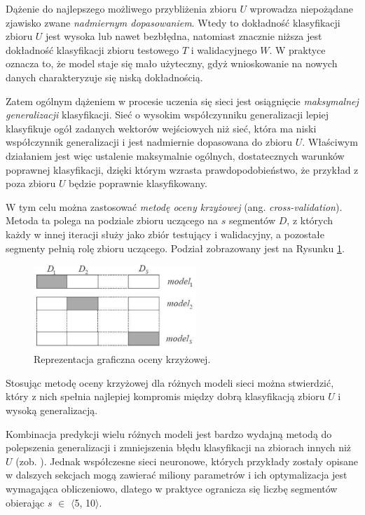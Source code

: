 Dążenie do najlepszego możliwego przybliżenia zbioru $U$ wprowadza niepożądane zjawisko zwane \textit{nadmiernym dopasowaniem}. Wtedy to dokładność klasyfikacji zbioru $U$ jest wysoka lub nawet bezbłędna, natomiast znacznie niższa jest dokładność klasyfikacji zbioru testowego $T$ i walidacyjnego $W$. W praktyce oznacza to, że model staje się mało użyteczny, gdyż wnioskowanie na nowych danych charakteryzuje się niską dokładnością.

Zatem ogólnym dążeniem w procesie uczenia się sieci jest osiągnięcie \textit{maksymalnej generalizacji} klasyfikacji. Sieć o wysokim współczynniku generalizacji lepiej klasyfikuje ogół zadanych wektorów wejściowych niż sieć, która ma niski współczynnik generalizacji i jest nadmiernie dopasowana do zbioru $U$. Właściwym działaniem jest więc ustalenie maksymalnie ogólnych, dostatecznych warunków poprawnej klasyfikacji, dzięki którym wzrasta prawdopodobieństwo, że przykład z poza zbioru $U$ będzie poprawnie klasyfikowany.

W tym celu można zastosować \textit{metodę oceny krzyżowej} (ang. \textit{cross-validation}). Metoda ta polega na podziale zbioru uczącego na $s$ segmentów $D$, z których każdy w innej iteracji służy jako zbiór testujący i walidacyjny, a pozostałe segmenty pełnią rolę zbioru uczącego. Podział zobrazowany jest na Rysunku \ref{cross-validation}.
\begin{figure}[h!]
	\centering
	\includegraphics[width=0.55\textwidth]{figures/cross-validation.png}
	\caption{Reprezentacja graficzna oceny krzyżowej.}
	\label{cross-validation}
\end{figure}
Stosując metodę oceny krzyżowej dla różnych modeli sieci można stwierdzić, który z nich spełnia najlepiej kompromis między dobrą klasyfikacją zbioru $U$ i wysoką generalizacją.

Kombinacja predykcji wielu różnych modeli jest bardzo wydajną metodą do polepszenia generalizacji i zmniejszenia błędu klasyfikacji na zbiorach innych niż $U$ (zob. \cite{Bell2007, Breiman2001}). Jednak współczesne sieci neuronowe, których przykłady zostały opisane w dalszych sekcjach mogą zawierać miliony parametrów i ich optymalizacja jest wymagająca obliczeniowo, dlatego w praktyce ogranicza się liczbę segmentów obierając $s$ $\in$ $\langle$5, 10$\rangle$.

